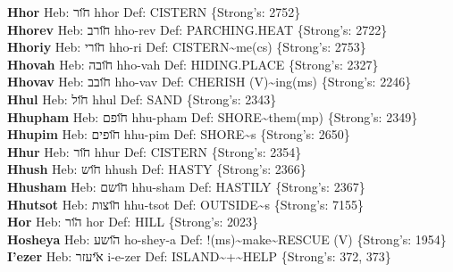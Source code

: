 {\textbf{Hhor} Heb: {\large\H חור} hhor Def: CISTERN \{Strong's: 2752\}\hfill{}\\

\textbf{Hhorev} Heb: {\large\H חורב} hho-rev Def: PARCHING.HEAT \{Strong's: 2722\}\hfill{}\\

\textbf{Hhoriy} Heb: {\large\H חורי} hho-ri Def: CISTERN\textasciitilde{}me(cs) \{Strong's: 2753\}\hfill{}\\

\textbf{Hhovah} Heb: {\large\H חובה} hho-vah Def: HIDING.PLACE \{Strong's: 2327\}\hfill{}\\

\textbf{Hhovav} Heb: {\large\H חובב} hho-vav Def: CHERISH (V)\textasciitilde{}ing(ms) \{Strong's: 2246\}\hfill{}\\

\textbf{Hhul} Heb: {\large\H חול} hhul Def: SAND \{Strong's: 2343\}\hfill{}\\

\textbf{Hhupham} Heb: {\large\H חופם} hhu-pham Def: SHORE\textasciitilde{}them(mp) \{Strong's: 2349\}\hfill{}\\

\textbf{Hhupim} Heb: {\large\H חופים} hhu-pim Def: SHORE\textasciitilde{}s \{Strong's: 2650\}\hfill{}\\

\textbf{Hhur} Heb: {\large\H חור} hhur Def: CISTERN \{Strong's: 2354\}\hfill{}\\

\textbf{Hhush} Heb: {\large\H חוש} hhush Def: HASTY \{Strong's: 2366\}\hfill{}\\

\textbf{Hhusham} Heb: {\large\H חושם} hhu-sham Def: HASTILY \{Strong's: 2367\}\hfill{}\\

\textbf{Hhutsot} Heb: {\large\H חוצות} hhu-tsot Def: OUTSIDE\textasciitilde{}s \{Strong's: 7155\}\hfill{}\\

\textbf{Hor} Heb: {\large\H הור} hor Def: HILL \{Strong's: 2023\}\hfill{}\\

\textbf{Hosheya} Heb: {\large\H הושע} ho-shey-a Def: !(ms)\textasciitilde{}make\textasciitilde{}RESCUE (V) \{Strong's: 1954\}\hfill{}\\

\textbf{I'ezer} Heb: {\large\H איעזר} i-e-zer Def: ISLAND\textasciitilde{}+\textasciitilde{}HELP \{Strong's: 372, 373\}\hfill{}\\

}
